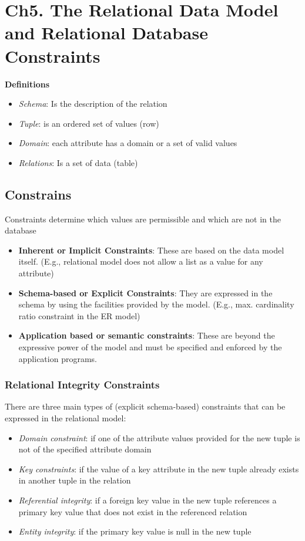 \section{Ch5. The Relational Data Model and Relational Database Constraints}
\noindent\textbf{Definitions}
\begin{itemize}
    \item \textit{Schema}: Is the description of the relation
    \item \textit{Tuple}: is an ordered set of values (row)
    \item \textit{Domain}: each attribute has a domain or a set of valid values
    \item \textit{Relations}: Is a set of data (table)
\end{itemize}

\subsection{Constrains}
Constraints determine which values are permissible and 
which are not in the database
\begin{itemize}
    \item \textbf{Inherent or Implicit Constraints}: These are based on the data model itself. (E.g., relational model does not allow a list as a value for any attribute)
    \item \textbf{Schema-based or Explicit Constraints}: They are expressed in the schema by using the facilities provided by the model. (E.g., max. cardinality ratio constraint in the ER model) 
    \item \textbf{Application based or semantic constraints}: These are beyond the expressive power of the model and must be specified and enforced by the application programs. 
\end{itemize}

\subsubsection{Relational Integrity Constraints}
There are three main types of (explicit schema-based) 
constraints that can be expressed in the relational model:
\begin{itemize}
    \item \textit{Domain constraint}: \newline if one of the attribute values provided for the new tuple is not of the specified attribute domain
    \item \textit{Key constraints}: \newline if the value of a key attribute in the new tuple already exists in another tuple in the relation
    \item \textit{Referential integrity}: \newline if a foreign key value in the new tuple references a primary key value that does not exist in the referenced relation
    \item \textit{Entity integrity}: \newline if the primary key value is null in the new tuple
\end{itemize}

